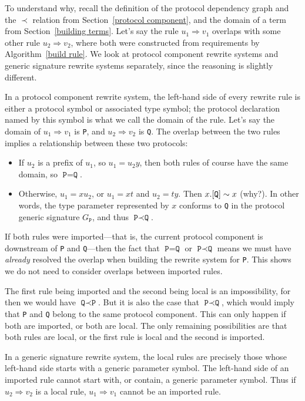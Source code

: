 \documentclass[../generics]{subfiles}
\begin{document}
To understand why, recall the definition of the protocol dependency graph and the $\prec$ relation from Section~\ref{protocol component}, and the domain of a term from Section~\ref{building terms}. Let's say the rule $u_1\Rightarrow v_1$ overlaps with some other rule $u_2\Rightarrow v_2$, where both were constructed from requirements by Algorithm~\ref{build rule}. We look at protocol component rewrite systems and generic signature rewrite systems separately, since the reasoning is slightly different.

In a protocol component rewrite system, the left-hand side of every rewrite rule is either a protocol symbol or associated type symbol; the protocol declaration named by this symbol is what we call the domain of the rule. Let's say the domain of $u_1\Rightarrow v_1$ is \texttt{P}, and $u_2\Rightarrow v_2$ is \texttt{Q}. The overlap between the two rules implies a relationship between these two protocols:
\begin{itemize}
\item If $u_2$ is a prefix of $u_1$, so $u_1=u_2y$, then both rules of course have the same domain, so $\texttt{P}=\texttt{Q}$.

\item Otherwise, $u_1=xu_2$, or $u_1=xt$ and $u_2=ty$. Then $x.[\texttt{Q}]\sim x$ (why?). In other words, the type parameter represented by $x$ conforms to \texttt{Q} in the protocol generic signature $G_\texttt{P}$, and thus $\texttt{P}\prec\texttt{Q}$.
\end{itemize}
If both rules were imported---that is, the current protocol component is downstream of \texttt{P} and \texttt{Q}---then the fact that $\texttt{P}=\texttt{Q}$ or $\texttt{P}\prec\texttt{Q}$ means we must have \emph{already} resolved the overlap when building the rewrite system for \texttt{P}. This shows we do not need to consider overlaps between imported rules.

The first rule being imported and the second being local is an impossibility, for then we would have $\texttt{Q}\prec\texttt{P}$. But it is also the case that $\texttt{P}\prec\texttt{Q}$, which would imply that \texttt{P} and \texttt{Q} belong to the same protocol component. This can only happen if both are imported, or both are local. The only remaining possibilities are that both rules are local, or the first rule is local and the second is imported.

In a generic signature rewrite system, the local rules are precisely those whose left-hand side starts with a generic parameter symbol. The left-hand side of an imported rule cannot start with, or contain, a generic parameter symbol. Thus if $u_2\Rightarrow v_2$ is a local rule, $u_1\Rightarrow v_1$ cannot be an imported rule.
\end{document}
